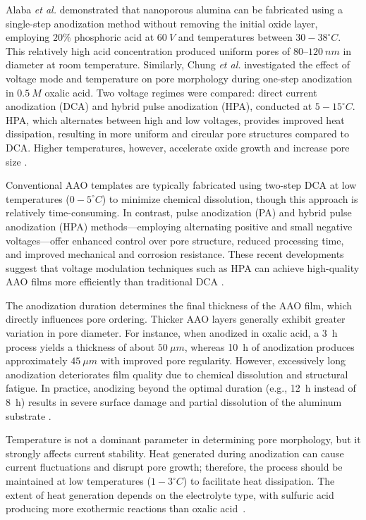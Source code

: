 \documentclass{rapportCS}
\begin{document}
	Alaba \textit{et al.} demonstrated that nanoporous alumina can be fabricated using a single-step anodization method without removing the initial oxide layer, employing $20\%$ phosphoric acid at $60~V$ and temperatures between $30 - 38^{\circ}C$. This relatively high acid concentration produced uniform pores of $80–120~nm$ in diameter at room temperature. Similarly, Chung \textit{et al.} investigated the effect of voltage mode and temperature on pore morphology during one-step anodization in $0.5~M$ oxalic acid. Two voltage regimes were compared: direct current anodization (DCA) and hybrid pulse anodization (HPA), conducted at $5 - 15^{\circ}C$. HPA, which alternates between high and low voltages, provides improved heat dissipation, resulting in more uniform and circular pore structures compared to DCA. Higher temperatures, however, accelerate oxide growth and increase pore size \cite{eessaa2023review}.  
	
	Conventional AAO templates are typically fabricated using two-step DCA at low temperatures ($0 - 5^{\circ}C$) to minimize chemical dissolution, though this approach is relatively time-consuming. In contrast, pulse anodization (PA) and hybrid pulse anodization (HPA) methods—employing alternating positive and small negative voltages—offer enhanced control over pore structure, reduced processing time, and improved mechanical and corrosion resistance. These recent developments suggest that voltage modulation techniques such as HPA can achieve high-quality AAO films more efficiently than traditional DCA \cite{eessaa2023review}.
	
	The anodization duration determines the final thickness of the AAO film, which directly influences pore ordering. Thicker AAO layers generally exhibit greater variation in pore diameter. For instance, when anodized in oxalic acid, a 3~h process yields a thickness of about $50~\mu m$, whereas 10~h of anodization produces approximately $45~\mu m$ with improved pore regularity. However, excessively long anodization deteriorates film quality due to chemical dissolution and structural fatigue. In practice, anodizing beyond the optimal duration (e.g., 12~h instead of 8~h) results in severe surface damage and partial dissolution of the aluminum substrate \cite{jessensky1998self}.  
	
	Temperature is not a dominant parameter in determining pore morphology, but it strongly affects current stability. Heat generated during anodization can cause current fluctuations and disrupt pore growth; therefore, the process should be maintained at low temperatures ($1 - 3^{\circ}C$) to facilitate heat dissipation. The extent of heat generation depends on the electrolyte type, with sulfuric acid producing more exothermic reactions than oxalic acid~\cite{jessensky1998self}.  
	
\end{document}

